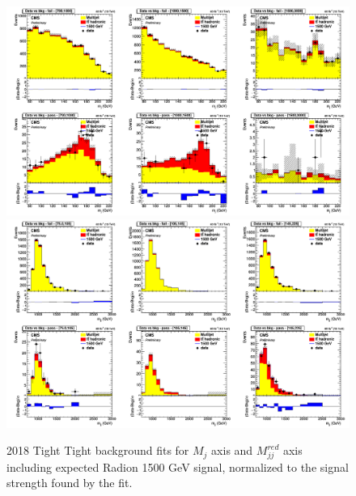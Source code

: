 \begin{figure}[!htb]
	\centering
	\includegraphics[width=1\textwidth]{Figures/postfit_projx_fits_18TT.png}
	\includegraphics[width=1\textwidth]{Figures/postfit_projy_fits_18TT.png}
	\caption{2018 Tight Tight background fits for $M_j$ axis and $M_{jj}^{red}$ axis including expected Radion 1500 GeV signal, normalized to the signal strength found by the fit.}
	\label{fig:18TT}
\end{figure}
